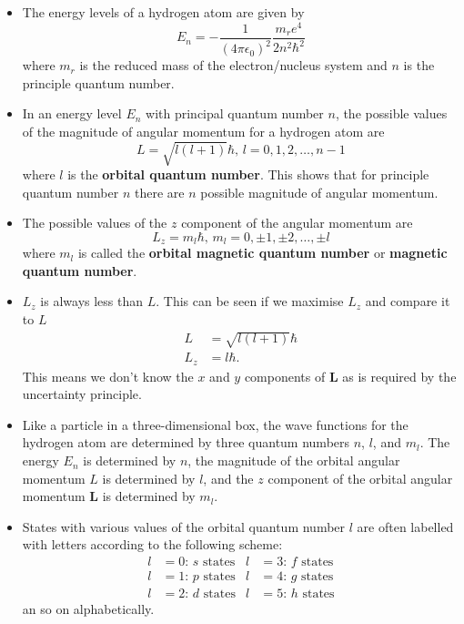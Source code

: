 \documentclass{article}
\begin{document}
\begin{itemize}
  \item The energy levels of a hydrogen atom are given by \[E_n = -\frac{1}{(4 \pi \epsilon_0)^2} \frac{m_r e^4}{2 n^2 \hbar^2}\] where $m_r$ is the reduced mass of the electron/nucleus system and $n$ is the principle quantum number.

  \item In an energy level $E_n$ with principal quantum number $n$, the possible values of the magnitude of angular momentum for a hydrogen atom are \[L = \sqrt{l (l + 1)} \hbar, \,l = 0, 1, 2, \ldots, n - 1\] where $l$ is the \textbf{orbital quantum number}. This shows that for principle quantum number $n$ there are $n$ possible magnitude of angular momentum.

  \item The possible values of the $z$ component of the angular momentum are \[L_z = m_l \hbar, \,m_l = 0, \pm 1, \pm 2, \ldots, \pm l\] where $m_l$ is called the \textbf{orbital magnetic quantum number} or \textbf{magnetic quantum number}.

  \item $L_z$ is always less than $L$. This can be seen if we maximise $L_z$ and compare it to $L$ \begin{align*}
          L   & = \sqrt{l (l + 1)} \hbar \\
          L_z & = l \hbar.
        \end{align*} This means we don't know the $x$ and $y$ components of $\mathbf{L}$ as is required by the uncertainty principle.

  \item Like a particle in a three-dimensional box, the wave functions for the hydrogen atom are determined by three quantum numbers $n$, $l$, and $m_l$. The energy $E_n$ is determined by $n$, the magnitude of the orbital angular momentum $L$ is determined by $l$, and the $z$ component of the orbital angular momentum $\mathbf{L}$ is determined by $m_l$.

  \item States with various values of the orbital quantum number $l$ are often labelled with letters according to the following scheme: \begin{align*}
          l & = 0 \text{: } s \text{ states} & l & = 3 \text{: } f \text{ states} \\
          l & = 1 \text{: } p \text{ states} & l & = 4 \text{: } g \text{ states} \\
          l & = 2 \text{: } d \text{ states} & l & = 5 \text{: } h \text{ states}
        \end{align*} an so on alphabetically.


\end{itemize}
\end{document}
